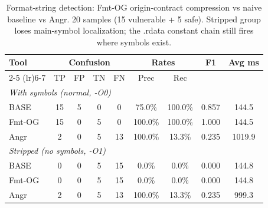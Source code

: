 \begin{table}[t]
\centering
\caption{Format-string detection: Fmt-OG origin-contract compression vs naive baseline vs Angr. 20 samples (15 vulnerable + 5 safe). Stripped group loses main-symbol localization; the .rdata constant chain still fires where symbols exist.}
\label{tab:fmt-og}
\begin{tabular}{lcccccccc}
\toprule
\multirow{2}{*}{Tool} & \multicolumn{4}{c}{Confusion} & \multicolumn{2}{c}{Rates} & \multirow{2}{*}{F1} & \multirow{2}{*}{Avg ms} \\
\cmidrule(lr){2-5} \cmidrule(lr){6-7}
 & TP & FP & TN & FN & Prec & Rec & & \\
\midrule
\multicolumn{9}{l}{\emph{With symbols (normal, -O0)}} \\
BASE & 15 & 5 & 0 & 0 & 75.0\% & 100.0\% & 0.857 & 144.5 \\
Fmt-OG & 15 & 0 & 5 & 0 & 100.0\% & 100.0\% & 1.000 & 144.5 \\
Angr & 2 & 0 & 5 & 13 & 100.0\% & 13.3\% & 0.235 & 1019.9 \\
\midrule
\multicolumn{9}{l}{\emph{Stripped (no symbols, -O1)}} \\
BASE & 0 & 0 & 5 & 15 & 0.0\% & 0.0\% & 0.000 & 144.8 \\
Fmt-OG & 0 & 0 & 5 & 15 & 0.0\% & 0.0\% & 0.000 & 144.8 \\
Angr & 2 & 0 & 5 & 13 & 100.0\% & 13.3\% & 0.235 & 999.3 \\
\bottomrule
\end{tabular}
\end{table}
